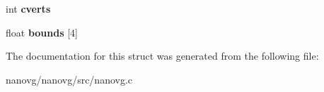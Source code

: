 \begin{DoxyCompactItemize}
\item 
\hypertarget{struct_n_v_gpath_cache_a645e22306364968e61dcb2b5b4c501de}{int {\bfseries cverts}}\label{struct_n_v_gpath_cache_a645e22306364968e61dcb2b5b4c501de}

\item 
\hypertarget{struct_n_v_gpath_cache_acb465a590c81dd4c068cc670988e86a1}{float {\bfseries bounds} \mbox{[}4\mbox{]}}\label{struct_n_v_gpath_cache_acb465a590c81dd4c068cc670988e86a1}

\end{DoxyCompactItemize}


The documentation for this struct was generated from the following file\+:\begin{DoxyCompactItemize}
\item 
nanovg/nanovg/src/nanovg.\+c\end{DoxyCompactItemize}
